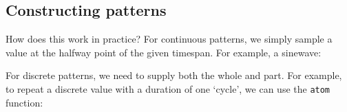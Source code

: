 \subsection{Constructing patterns}\label{constructing-patterns}

How does this work in practice? For continuous patterns, we simply
sample a value at the halfway point of the given timespan. For example,
a sinewave:

\begin{Shaded}
\begin{Highlighting}[]
  
\OtherTok{=}  \OperatorTok{$}\OtherTok{{-}\textgreater{}}\NormalTok{ [} \OperatorTok{$}  \OperatorTok{$}\NormalTok{ (} \OperatorTok{$}\OperatorTok{*}  \OperatorTok{*} \NormalTok{]}
    \OtherTok{=}\OperatorTok{+}\OperatorTok{{-}}\OperatorTok{/} \NormalTok{)}
\end{Highlighting}
\end{Shaded}

For discrete patterns, we need to supply both the whole and part. For
example, to repeat a discrete value with a duration of one `cycle', we
can use the \texttt{atom} function:

